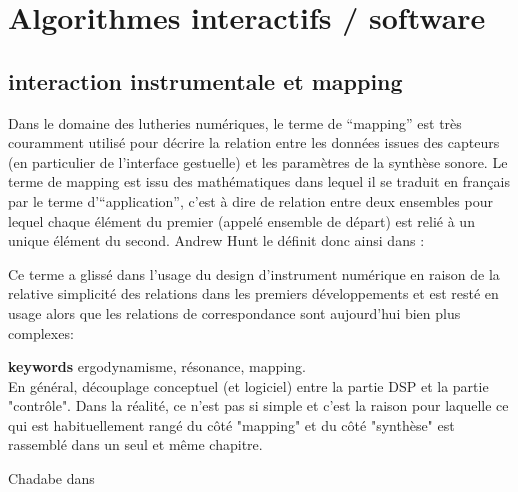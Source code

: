 %
\chapter{Algorithmes interactifs / software}
\label{ch:algorithms}


\section{interaction instrumentale et mapping}

\noindent Dans le domaine des lutheries numériques, le terme de ``mapping'' est très couramment utilisé pour décrire la relation entre les données issues des capteurs (en particulier de l'interface gestuelle) et les paramètres de la synthèse sonore. 
Le terme de mapping est issu des mathématiques dans lequel il se traduit en français par le terme d'``application'', c'est à dire de relation entre deux ensembles pour lequel chaque élément du premier (appelé ensemble de départ) est relié à un unique élément du second. Andrew Hunt le définit donc ainsi dans \cite{hunt_mapping_2002}: 

\indent Ce terme a glissé dans l'usage du design d'instrument numérique en raison de la relative simplicité des relations dans les premiers développements et est resté en usage alors que les relations de correspondance sont aujourd'hui bien plus complexes:


\textbf{keywords} ergodynamisme, résonance, mapping.\\
En général, découplage conceptuel (et logiciel) entre la partie DSP et la partie "contrôle". Dans la réalité, ce n'est pas si simple et c'est la raison pour laquelle ce qui est habituellement rangé du côté "mapping" et du côté "synthèse" est rassemblé dans un seul et même chapitre.

 Chadabe dans \cite{chadabe_limitations_2002}


